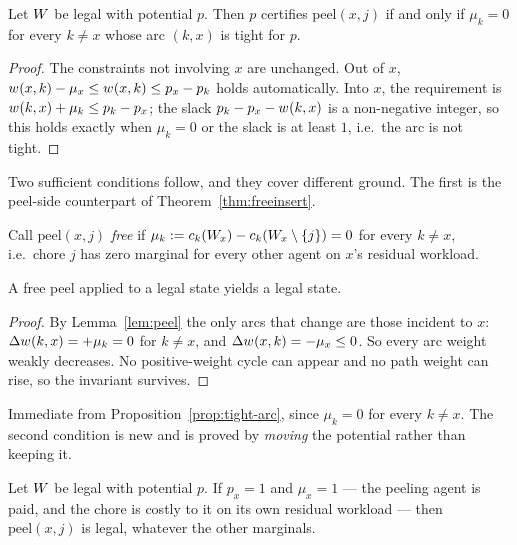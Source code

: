 \begin{proposition}
\label{prop:tight-arc}
Let $W$ be legal with potential $p$. Then $p$ certifies
$\mathrm{peel}(x,j)$ if and only if $\mu_k = 0$ for every $k \ne x$ whose arc
$(k,x)$ is tight for $p$.
\end{proposition}

\begin{proof}
The constraints not involving $x$ are unchanged. Out of $x$,
$w_{}(x,k) - \mu_x \le w_{}(x,k) \le p_x - p_k$ holds automatically. Into
$x$, the requirement is $w_{}(k,x) + \mu_k \le p_k - p_x$; the slack
$p_k - p_x - w_{}(k,x)$ is a non-negative integer, so this holds exactly when
$\mu_k = 0$ or the slack is at least $1$, i.e.\ the arc is not tight.
\end{proof}

Two sufficient conditions follow, and they cover different ground. The first is
the peel-side counterpart of Theorem~\ref{thm:freeinsert}.

\begin{definition}
\label{def:freepeel}
Call $\mathrm{peel}(x,j)$ \emph{free} if $\mu_k := c_k(W_x) -
c_k(W_x \setminus \left\{j\right\}) = 0$ for every $k \ne x$, i.e.\ chore
$j$ has zero marginal for every other agent on $x$'s residual workload.
\end{definition}

\begin{lemma}
\label{lem:free-peel-safe}
A free peel applied to a legal state yields a legal state.
\end{lemma}

\begin{proof}
By Lemma~\ref{lem:peel} the only arcs that change are those incident to $x$:
$\Delta w_{}(k,x) = +\mu_k = 0$ for $k \ne x$, and
$\Delta w_{}(x,k) = -\mu_x \le 0$. So every arc weight weakly decreases. No
positive-weight cycle can appear and no path weight can rise, so the invariant
survives.
\end{proof}

Immediate from Proposition~\ref{prop:tight-arc}, since $\mu_k = 0$ for every
$k \ne x$. The second condition is new and is proved by \emph{moving} the
potential rather than keeping it.

\begin{lemma}
\label{lem:paid-peel}
Let $W$ be legal with potential $p$. If $p_x = 1$ and $\mu_x = 1$ ---
the peeling agent is paid, and the chore is costly to it on its own residual
workload --- then $\mathrm{peel}(x,j)$ is legal, whatever the other marginals.
\end{lemma}

